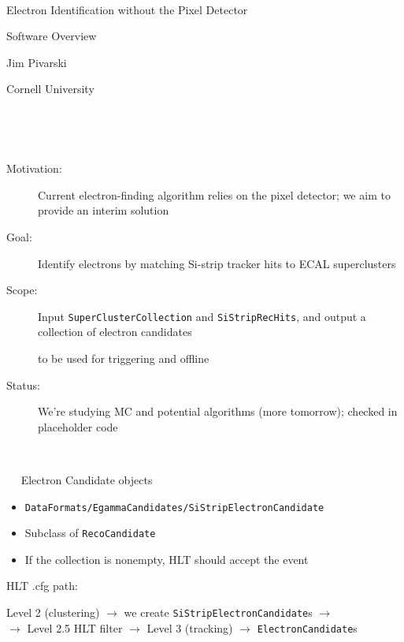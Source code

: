 \documentclass[landscape]{article}
\newenvironment{slide}[1][ ]{\mbox{\bf #1 } \vfill}{\vfill \mbox{ } \hfill \Large \arabic{page} \pagebreak}
\begin{document}
\Huge \sffamily
\renewcommand{\labelitemi}{{\LARGE $\stackrel{\bullet}{\mbox{ }}$}}
\setlength{\parindent}{0 cm}

\begin{slide}
\begin{center}
Electron Identification without the Pixel Detector

\vspace{0.5 cm}
Software Overview

\vspace{1.5 cm}
Jim Pivarski

\vspace{0.25 cm}
Cornell University
\end{center}
\end{slide}

\begin{slide}
\begin{description}

\item[Motivation:] Current electron-finding algorithm relies on the
pixel detector; we aim to provide an interim solution

\vfill
\item[Goal:] Identify electrons by matching Si-strip tracker hits to
ECAL superclusters

\vfill
\item[Scope:] Input {\tt SuperClusterCollection} and
{\tt SiStripRecHits}, and output a collection of electron candidates

\vspace{0.5 cm}
to be used for triggering and offline

\vfill
\item[Status:] We're studying MC and potential algorithms (more
tomorrow); checked in placeholder code

\end{description}
\end{slide}

\begin{slide}
Electron Candidate objects

\vfill
\begin{itemize}

\item {\tt DataFormats/EgammaCandidates/SiStripElectronCandidate}

\vfill
\item Subclass of {\tt RecoCandidate}

\vfill
\item If the collection is nonempty, HLT should accept the event

\end{itemize}

\vfill
HLT .cfg path:

\begin{center}
Level 2 (clustering) $\rightarrow$ we create {\tt SiStripElectronCandidate}s $\rightarrow$ \\

\vspace{0.5 cm}
$\rightarrow$ Level 2.5 HLT filter $\rightarrow$ Level 3 (tracking) $\rightarrow$ {\tt ElectronCandidate}s
\end{center}
\end{slide}
\end{document}
